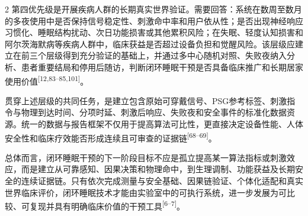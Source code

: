 \documentclass[UTF8,zihao=5,fontset=none]{ctexart}
\newcommand{\hei}{\CJKfamily{hei}}
\newcommand{\leveltwo}[1]{%
  \par\noindent{\hei\fontsize{10pt}{12pt}\selectfont\bfseries #1\par}}
\newcommand{\refcite}[1]{\nolinebreak[4]\textsuperscript{[#1]}}
\begin{document}
\begin{multicols}{2}
第四优先级是开展疾病人群的长期真实世界验证。需要回答：系统在数周至数月的多夜使用中是否保持信号稳定性、刺激命中率和用户依从性；是否出现神经响应习惯化、睡眠结构扰动、次日功能损害或其他累积风险；在失眠、轻度认知损害和阿尔茨海默病等疾病人群中，临床获益是否超过设备负担和觉醒风险。该层级应建立在前三个层级得到充分验证的基础上，并通过多中心随机对照、失败夜纳入分析、患者重要结局和停用后随访，判断闭环睡眠干预是否具备临床推广和长期居家使用价值\refcite{12,83--85,101}。\par

贯穿上述层级的共同任务，是建立包含原始可穿戴信号、PSG参考标签、刺激指令与物理到达时间、分项时延、刺激后响应、失败夜和安全事件的标准化数据资源。统一的数据与报告框架不仅用于提高算法可比性，更直接决定设备性能、人体安全性和临床疗效能否形成连续且可审查的证据链\refcite{68--69}。\par

\leveltwo{7.3 总结}

总体而言，闭环睡眠干预的下一阶段目标不应是孤立提高某一算法指标或刺激效应，而是建立从可靠感知、因果决策和物理命中，到生理调制、功能获益及长期安全的连续证据链。只有依次完成测量与安全基础、因果链验证、个体化适配和真实世界临床评价，闭环睡眠技术才能由实验室中的可执行系统，进一步发展为可比较、可复现并具有明确临床价值的干预工具\refcite{6--7}。\par



\end{multicols}
\end{document}
